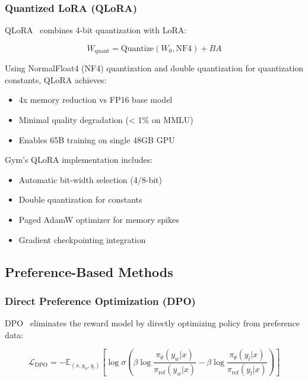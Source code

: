 \documentclass[11pt,letterpaper]{article}
\begin{document}
\subsubsection{Quantized LoRA (QLoRA)}

QLoRA~\citep{dettmers2023qlora} combines 4-bit quantization with LoRA:

\begin{equation}
W_{\text{quant}} = \text{Quantize}(W_0, \text{NF4}) + BA
\end{equation}

Using NormalFloat4 (NF4) quantization and double quantization for quantization constants, QLoRA achieves:
\begin{itemize}
\item 4x memory reduction vs FP16 base model
\item Minimal quality degradation (< 1\% on MMLU)
\item Enables 65B training on single 48GB GPU
\end{itemize}

Gym's QLoRA implementation includes:
\begin{itemize}
\item Automatic bit-width selection (4/8-bit)
\item Double quantization for constants
\item Paged AdamW optimizer for memory spikes
\item Gradient checkpointing integration
\end{itemize}

\subsection{Preference-Based Methods}

\subsubsection{Direct Preference Optimization (DPO)}

DPO~\citep{rafailov2023dpo} eliminates the reward model by directly optimizing policy from preference data:

\begin{equation}
\mathcal{L}_{\text{DPO}} = -\mathbb{E}_{(x, y_w, y_l)} \left[ \log \sigma \left( \beta \log \frac{\pi_\theta(y_w|x)}{\pi_{\text{ref}}(y_w|x)} - \beta \log \frac{\pi_\theta(y_l|x)}{\pi_{\text{ref}}(y_l|x)} \right) \right]
\end{equation}
\end{document}

